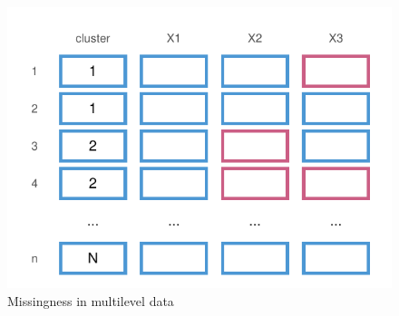 \documentclass[
]{jss}
\begin{document}
\begin{CodeChunk}
\begin{figure}

{\centering \includegraphics{Imputation_of_Incomplete_Multilevel_Data_files/figure-latex/patterns-1} 

}

\caption[Missingness in multilevel data]{Missingness in multilevel data}\label{fig:patterns}
\end{figure}
\end{CodeChunk}
\end{document}
